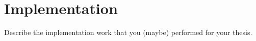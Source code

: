 \setchaptertoc
\chapter{Implementation}\label{chp:implementation}

\begin{summary}
Describe the implementation work that you (maybe) performed for your thesis.
\end{summary}

